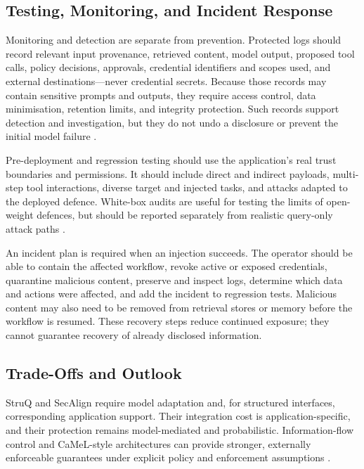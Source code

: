 \subsection{Testing, Monitoring, and Incident Response}

Monitoring and detection are separate from prevention. Protected logs should
record relevant input provenance, retrieved content, model output, proposed tool
calls, policy decisions, approvals, credential identifiers and scopes used, and
external destinations---never credential secrets. Because those records may
contain sensitive prompts and outputs, they require access control, data
minimisation, retention limits, and integrity protection. Such records support
detection and investigation, but they do not undo a disclosure or prevent the
initial model failure
\parencite{owasp2025llm}.

Pre-deployment and regression testing should use the application's real trust
boundaries and permissions. It should include direct and indirect payloads,
multi-step tool interactions, diverse target and injected tasks, and attacks
adapted to the deployed defence. White-box audits are useful for testing the
limits of open-weight defences, but should be reported separately from realistic
query-only attack paths
\parencites{debenedetti2024agentdojo}{jia2025critical}
{yang2025checkpointgcg}{pandya2025astra}.

An incident plan is required when an injection succeeds. The operator should be
able to contain the affected workflow, revoke active or exposed credentials,
quarantine malicious content, preserve and inspect logs, determine which data
and actions were affected, and add the incident to regression tests. Malicious
content may also need to be removed from retrieval stores or memory before the
workflow is resumed. These recovery steps reduce continued exposure; they cannot
guarantee recovery of already disclosed information.

\subsection{Trade-Offs and Outlook}

StruQ and SecAlign require model adaptation and, for structured interfaces,
corresponding application support. Their integration cost is application-specific,
and their protection remains model-mediated and probabilistic. Information-flow
control and CaMeL-style architectures can provide stronger, externally
enforceable guarantees under explicit policy and enforcement assumptions
\parencites{wu2024systemlevel}{debenedetti2025defeating}.

